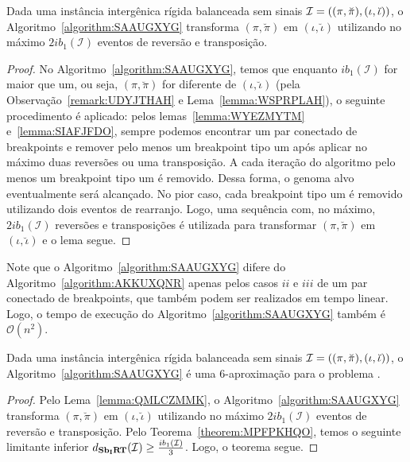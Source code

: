 \begin{lemma}\label{lemma:QMLCZMMK}
Dada uma instância intergênica rígida balanceada sem sinais $\mathcal{I}=((\pi,\breve\pi),\break(\iota,\breve\iota))$, o Algoritmo~\ref{algorithm:SAAUGXYG} transforma $(\pi,\breve\pi)$ em $(\iota,\breve\iota)$ utilizando no máximo $2ib_1(\mathcal{I})$ eventos de reversão e transposição.
\end{lemma}
\begin{proof}
  No Algoritmo~\ref{algorithm:SAAUGXYG}, temos que enquanto $ib_1(\mathcal{I})$ for maior que um, ou seja, $(\pi,\breve\pi)$ for diferente de $(\iota,\breve\iota)$ (pela Observação~\ref{remark:UDYJTHAH} e Lema~\ref{lemma:WSPRPLAH}), o seguinte procedimento é aplicado: pelos lemas~\ref{lemma:WYEZMYTM} e~\ref{lemma:SIAFJFDO}, sempre podemos encontrar um par conectado de breakpoints e remover pelo menos um breakpoint tipo um após aplicar no máximo duas reversões ou uma transposição. A cada iteração do algoritmo pelo menos um breakpoint tipo um é removido. Dessa forma, o genoma alvo eventualmente será alcançado. No pior caso, cada breakpoint tipo um é removido utilizando dois eventos de rearranjo. Logo, uma sequência com, no máximo, $2ib_1(\mathcal{I})$ reversões e transposições é utilizada para transformar $(\pi,\breve\pi)$ em $(\iota,\breve\iota)$ e o lema segue.
\end{proof}

Note que o Algoritmo~\ref{algorithm:SAAUGXYG} difere do Algoritmo~\ref{algorithm:AKKUXQNR} apenas pelos casos $ii$ e $iii$ de um par conectado de breakpoints, que também podem ser realizados em tempo linear. Logo, o tempo de execução do Algoritmo~\ref{algorithm:SAAUGXYG} também é $\mathcal{O}(n^2)$.

\begin{theorem}\label{theorem:ZEFRNBIE}
Dada uma instância intergênica rígida balanceada sem sinais $\mathcal{I}=\break((\pi,\breve\pi),(\iota,\breve\iota))$, o Algoritmo~\ref{algorithm:SAAUGXYG} é uma $6$-aproximação para o problema \SbIRT{}.
\end{theorem}
\begin{proof}
Pelo Lema~\ref{lemma:QMLCZMMK}, o Algoritmo~\ref{algorithm:SAAUGXYG} transforma $(\pi,\breve\pi)$ em $(\iota,\breve\iota)$ utilizando no máximo $2ib_1(\mathcal{I})$ eventos de reversão e transposição. Pelo Teorema~\ref{theorem:MPFPKHQO}, temos o seguinte limitante inferior $d_{\textbf{Sb\textsubscript{I}RT}}(\mathcal{I}) \ge \frac{ib_1(\mathcal{I})}{3}$. Logo, o teorema segue. 
\end{proof}

